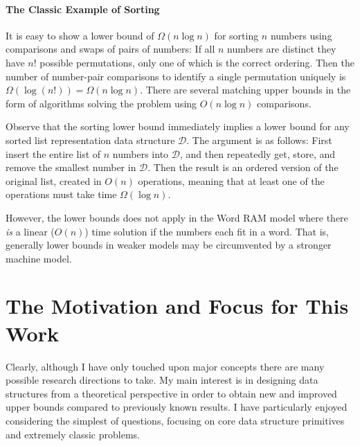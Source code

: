 \begin{leftbar}
    \vspace{-1.4em} \paragraph{The Classic Example of Sorting}
    It is easy to show a lower bound of $\Omega(n \log n)$ for sorting $n$ numbers using comparisons and swaps of pairs of numbers: If all $n$ numbers are distinct they have $n!$ possible permutations, only one of which is the correct ordering. Then the number of number-pair comparisons to identify a single permutation uniquely is $\Omega(\log (n!)) = \Omega(n \log n)$. There are several matching upper bounds in the form of algorithms solving the problem using $O(n \log n)$ comparisons.

    Observe that the sorting lower bound immediately implies a lower bound for any sorted list representation data structure $\mathcal{D}$. The argument is as follows: First insert the entire list of $n$ numbers into $\mathcal{D}$, and then repeatedly get, store, and remove the smallest number in $\mathcal{D}$. Then the result is an ordered version of the original list, created in $O(n)$ operations, meaning that at least one of the operations must take time $\Omega(\log n)$.

    However, the lower bounds does not apply in the Word RAM model where there \emph{is} a linear ($O(n)$) time solution if the numbers each fit in a word. That is, generally lower bounds in weaker models may be circumvented by a stronger machine model.
\end{leftbar}

\section{The Motivation and Focus for This Work}
Clearly, although I have only touched upon major concepts there are many possible research directions to take. My main interest is in designing data structures from a theoretical perspective in order to obtain new and improved upper bounds compared to previously known results. I have particularly enjoyed considering the simplest of questions, focusing on core data structure primitives and extremely classic problems.


